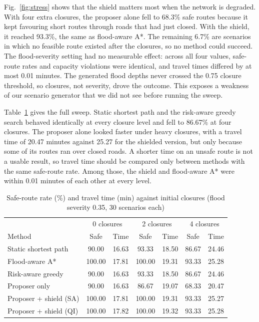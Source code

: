 \documentclass[conference]{IEEEtran}
\begin{document}
Fig.~\ref{fig:stress} shows that the shield matters most when the network is degraded. With four extra closures, the proposer alone fell to 68.3\% safe routes because it kept favouring short routes through roads that had just closed. With the shield, it reached 93.3\%, the same as flood-aware A*. The remaining 6.7\% are scenarios in which no feasible route existed after the closures, so no method could succeed. The flood-severity setting had no measurable effect: across all four values, safe-route rates and capacity violations were identical, and travel times differed by at most 0.01 minutes. The generated flood depths never crossed the 0.75 closure threshold, so closures, not severity, drove the outcome. This exposes a weakness of our scenario generator that we did not see before running the sweep.

Table~\ref{tab:sweep} gives the full sweep. Static shortest path and the risk-aware greedy search behaved identically at every closure level and fell to 86.67\% at four closures. The proposer alone looked faster under heavy closures, with a travel time of 20.47 minutes against 25.27 for the shielded version, but only because some of its routes ran over closed roads. A shorter time on an unsafe route is not a usable result, so travel time should be compared only between methods with the same safe-route rate. Among those, the shield and flood-aware A* were within 0.01 minutes of each other at every level.

\begin{table}[t]
\caption{Safe-route rate (\%) and travel time (min) against initial closures (flood severity 0.35, 30 scenarios each)}
\label{tab:sweep}
\centering
\footnotesize
\setlength{\tabcolsep}{2.6pt}
\begin{tabular}{lcccccc}
\toprule
 & \multicolumn{2}{c}{0 closures} & \multicolumn{2}{c}{2 closures} & \multicolumn{2}{c}{4 closures}\\
Method & Safe & Time & Safe & Time & Safe & Time\\
\midrule
Static shortest path & 90.00 & 16.63 & 93.33 & 18.50 & 86.67 & 24.46\\
Flood-aware A* & 100.00 & 17.81 & 100.00 & 19.31 & 93.33 & 25.28\\
Risk-aware greedy & 90.00 & 16.63 & 93.33 & 18.50 & 86.67 & 24.46\\
Proposer only & 90.00 & 16.63 & 86.67 & 19.07 & 68.33 & 20.47\\
Proposer + shield (SA) & 100.00 & 17.81 & 100.00 & 19.31 & 93.33 & 25.27\\
Proposer + shield (QI) & 100.00 & 17.82 & 100.00 & 19.32 & 93.33 & 25.28\\
\bottomrule
\end{tabular}
\end{table}
\end{document}
